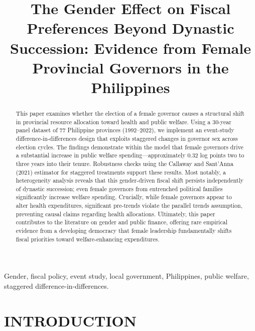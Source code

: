 \documentclass[conference]{IEEEtran}
\begin{document}
\title{The Gender Effect on Fiscal Preferences Beyond Dynastic Succession: Evidence from Female Provincial Governors in the Philippines}

\author{
}

\maketitle

\begin{abstract}
This paper examines whether the election of a female governor causes a structural shift in provincial resource allocation toward health and public welfare. Using a 30-year panel dataset of 77 Philippine provinces (1992--2022), we implement an event-study difference-in-differences design that exploits staggered changes in governor sex across election cycles. The findings demonstrate within the model that female governors drive a substantial increase in public welfare spending---approximately 0.32 log points two to three years into their tenure. Robustness checks using the Callaway and Sant'Anna (2021) estimator for staggered treatments support these results. Most notably, a heterogeneity analysis reveals that this gender-driven fiscal shift persists independently of dynastic succession; even female governors from entrenched political families significantly increase welfare spending. Crucially, while female governors appear to alter health expenditures, significant pre-trends violate the parallel trends assumption, preventing causal claims regarding health allocations. Ultimately, this paper contributes to the literature on gender and public finance, offering rare empirical evidence from a developing democracy that female leadership fundamentally shifts fiscal priorities toward welfare-enhancing expenditures.
\end{abstract}

\begin{IEEEkeywords}
Gender, fiscal policy, event study, local government, Philippines, public welfare, staggered difference-in-differences.
\end{IEEEkeywords}

\section{INTRODUCTION}
\end{document}
